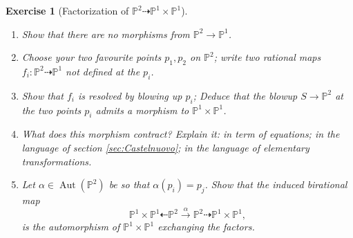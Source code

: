 \documentclass[a4paper,11pt]{amsart}
\newtheorem{exercise}[theorem]{Exercise}
\def\Aut{\operatorname{Aut}}
\newcommand{\PP}{\mathbb{P}}
\newcommand{\rmap}{\dashrightarrow}
\begin{document}
\begin{exercise}[Factorization of {\small $\PP^2 \rmap \PP^1 \times \PP^1$}]\label{exer:factorizationP2toF0}\leavevmode
	\begin{enumerate}
		\item Show that there are no morphisms from $\PP^2 \to \PP^1$.
		\item Choose your two favourite points $p_1, p_2$ on $\PP^2$; write two rational maps $f_i\colon \PP^2 \rmap \PP^1$ not defined at the $p_i$.
		\item Show that $f_i$ is resolved by blowing up $p_i$;
		Deduce that the blowup $S \to \PP^2$  at the two points $p_i$ admits a morphism to $\PP^1 \times \PP^1$.
		\item What does this morphism contract? 
		Explain it: in term of equations; in the language of section \ref{sec:Castelnuovo}; in the language of elementary transformations.
		\item Let $\alpha \in \Aut(\PP^2)$ be so that $\alpha(p_i) = p_j$.
		Show that the induced birational map
		\[
		\PP^1\times \PP^1 \dashleftarrow \PP^2 \overset{\alpha}{\longrightarrow} \PP^2 \rmap \PP^1 \times \PP^1,
		\]
		is the automorphism of $\PP^1 \times \PP^1$ exchanging the factors.
		\begin{comment}
		\begin{align*}
			(u_0,u_1),(v_0,v_1) &\mapsto (u_0v_0,u_1v_0,u_0v_1) \\
			&\mapsto (u_0v_0,u_0v_1,u_1v_0) \mapsto (u_0v_0,u_0v_1),(u_0v_0,u_1v_0) = (v_0,v_1),(u_0,u_1).
		\end{align*}
		\end{comment}
	\end{enumerate}
\end{exercise}
\end{document}

